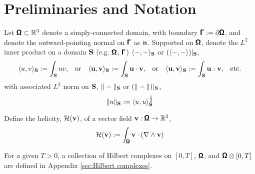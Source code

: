 \section*{Preliminaries and Notation}

    Let $\pmb{\mathsf{\Omega}}  \subset  \mathbb{R}^{3}$ denote a  simply-connected domain, with boundary $\pmb{\mathsf{\Gamma}}  :=  \partial\pmb{\mathsf{\Omega}}$, and denote the outward-pointing normal on $\pmb{\mathsf{\Gamma}}$ as $\mathbf{n}$. Supported on $\pmb{\mathsf{\Omega}}$, denote the $L^{2}$ inner product on a domain $\mathbf{S}$ (e.g. $\pmb{\mathsf{\Omega}}$, $\pmb{\mathsf{\Gamma}}$) $\langle-, -\rangle_{\mathbf{S}}$ or $(\langle-, -\rangle)|_{\mathbf{S}}$,
    \begin{align}
        \langle u, v\rangle_{\mathbf{S}}  :=  \int_{\mathbf{S}}uv,  &&
        \text{or}  &&
        \langle \mathbf{u}, \mathbf{v}\rangle_{\mathbf{S}}  :=  \int_{\mathbf{S}}\mathbf{u}\cdot\mathbf{v},  &&
        \text{or}  &&
        \langle \mathbf{u}, \mathbf{v}\rangle_{\mathbf{S}}  :=  \int_{\mathbf{S}}\mathbf{u}:\mathbf{v},  &&
        \text{etc.}
    \end{align}
    with associated $L^{2}$ norm on $\mathbf{S}$, $\|-\|_{\mathbf{S}}$ or $(\|-\|)|_{\mathbf{S}}$,
    \begin{equation}
        \|u\|_{\mathbf{S}}  :=  \langle u, u\rangle_{\mathbf{S}}^{\frac{1}{2}}
    \end{equation}
    
    Define the helicity, $\mathcal{H}(\mathbf{v})$, of a vector field $\mathbf{v} : \pmb{\mathsf{\Omega}} \rightarrow \mathbb{R}^{3}$, 
    \begin{equation}
        \mathcal{H}(\mathbf{v})  :=  \int_{\pmb{\mathsf{\Omega}}}\mathbf{v}\cdot(\nabla\wedge\mathbf{v})
    \end{equation}

    For a given $T > 0$, a collection of Hilbert complexes on $[0, T]$, $\pmb{\mathsf{\Omega}}$, and $\pmb{\mathsf{\Omega}}\otimes[0, T]$ are defined in Appendix \ref{sec:Hilbert complexes}.
    